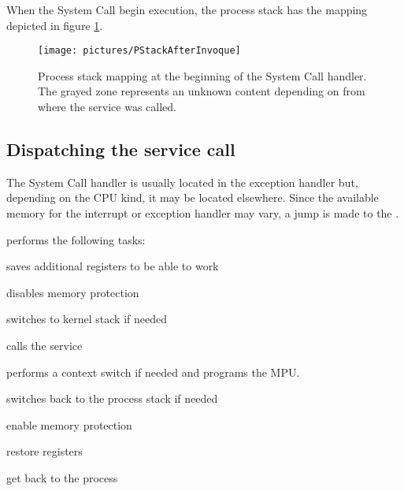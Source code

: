 When the System Call begin execution, the process stack has the mapping depicted in figure \ref{fig:stackbeginningSC}.

\begin{figure}[htbp] %
\begin{minipage}{0.5\textwidth}
    \centering
  \texttt{[image: pictures/PStackAfterInvoque]} 
\end{minipage}
\begin{minipage}{0.5\textwidth}
   \caption{Process stack mapping at the beginning of the System Call handler. The grayed zone represents an unknown content depending on from where the service was called.}\label{fig:stackbeginningSC}
\end{minipage}
\end{figure}

\subsection{Dispatching the service call}

The System Call handler is usually located in the  exception handler but, depending on the CPU kind, it may be located elsewhere. Since the available memory for the interrupt or exception handler may vary, a jump is made to the .%

%

 performs the following tasks:
\begin{penum}
\item saves additional registers to be able to work
\item disables memory protection
\item switches to kernel stack if needed
\item calls the service
\item performs a context switch if needed and programs the MPU.
\item switches back to the process stack if needed
\item enable memory protection
\item restore registers
\item get back to the process
\end{penum}


